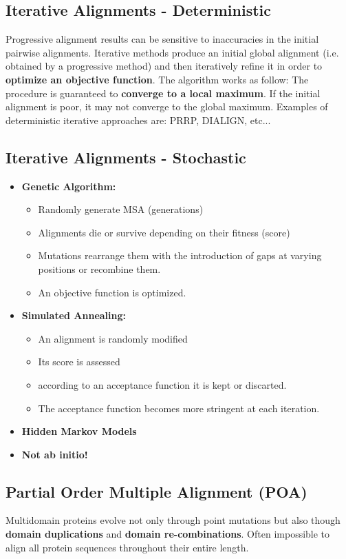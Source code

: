 \subsection{Iterative Alignments - Deterministic}
Progressive alignment results can be sensitive to inaccuracies in the initial pairwise alignments. Iterative methods produce an initial global alignment (i.e. obtained by a progressive method) and then iteratively refine it in order to \textbf{optimize an objective function}. The algorithm works as follow:
The procedure is guaranteed to \textbf{converge to a local maximum}. If the initial alignment is poor, it may not converge to the global maximum. Examples of deterministic iterative approaches are: PRRP, DIALIGN, etc...

\subsection{Iterative Alignments - Stochastic}
\begin{itemize}
	\item \textbf{Genetic Algorithm:}
	\begin{itemize}
		\item Randomly generate MSA (generations)
		\item Alignments die or survive depending on their fitness (score)
		\item Mutations rearrange them with the introduction of gaps at varying positions or recombine them.	
		\item An objective function is optimized.
	\end{itemize} 

	\item \textbf{Simulated Annealing:}
	\begin{itemize}
		\item An alignment is randomly modified
		\item Its score is assessed
		\item according to an acceptance function it is kept or discarted.
		\item The acceptance function becomes more stringent at each iteration.
	\end{itemize} 
	\item \textbf{Hidden Markov Models}
	\item \textbf{Not ab initio!}
\end{itemize}

\subsection{Partial Order Multiple Alignment (POA)}
Multidomain proteins evolve not only through point mutations but also though \textbf{domain duplications} and \textbf{domain re-combinations}. Often impossible to align all protein sequences throughout their entire length.

